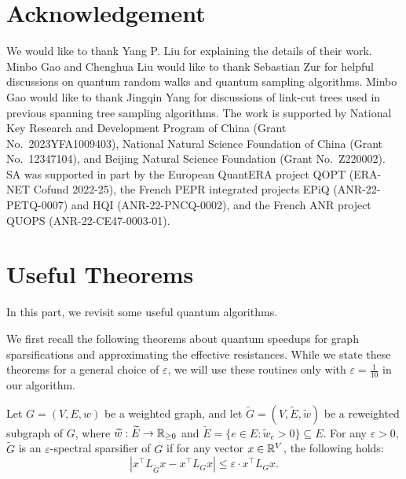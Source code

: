 \documentclass[11pt]{article}
\newcommand{\abss}[1]{\left\lvert #1 \right\rvert}
\newcommand{\parens}[1]{( #1 )}
\newcommand{\sets}[1]{\{ #1 \}}
\begin{document}
{\section*{Acknowledgement}\label{sec:ack}

We would like to thank Yang P. Liu for explaining the details of their work.
Minbo Gao and Chenghua Liu would like to thank
Sebastian Zur
for helpful discussions on quantum random walks and quantum sampling algorithms. 
Minbo Gao would like to thank
Jingqin Yang for discussions
of link-cut trees used in previous spanning tree sampling algorithms.
The work is supported by National Key Research and Development Program of China
(Grant No.\ 2023YFA1009403), National Natural Science Foundation of China (Grant
No.\ 12347104), and Beijing Natural Science Foundation (Grant No.\ Z220002).
SA was supported in part by the European QuantERA project QOPT (ERA-NET Cofund 2022-25), the French PEPR integrated projects EPiQ (ANR-22-PETQ-0007) and HQI (ANR-22-PNCQ-0002), and the French ANR project QUOPS (ANR-22-CE47-0003-01).





\appendix


\section{Useful Theorems}

In this part, we revisit some useful
quantum algorithms.

We first recall the following theorems 
about quantum speedups for graph sparsifications
and approximating the effective resistances.
While we state these theorems for a general choice of $\varepsilon$, we will use these routines only with $\varepsilon = \frac{1}{10}$ in our algorithm.


\begin{definition}\label{def:graph-spectral-sparsifier}
	Let $ G=\parens{V,E,w}$ be a weighted graph, and let $\tilde G =\parens{V,\tilde E, \tilde w}$ be a reweighted
	subgraph of $G$, where $\widetilde{w}:\widetilde{E}\rightarrow \mathbb{R}_{\geq 0}$ and
	$\tilde E= \sets{e\in E: \tilde w_e>0} \subseteq E$.
	For any $\varepsilon >0$, $\tilde G $ is an $\varepsilon$-spectral sparsifier
	of $G$ if for any vector $x\in \mathbb{R}^V$, the following holds:
	\begin{equation*}
		\abss{x ^\top  L_ {\tilde G}x  -x ^\top L_ { G}  x} \leq
		\varepsilon \cdot x ^\top L_ { G}  x.
	\end{equation*}
\end{definition}


}
\end{document}
